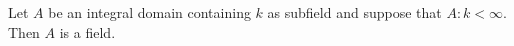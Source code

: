 Let $A$ be an integral domain containing $k$ as subfield and suppose that $A:k < \infty$. Then $A$ is a field.

